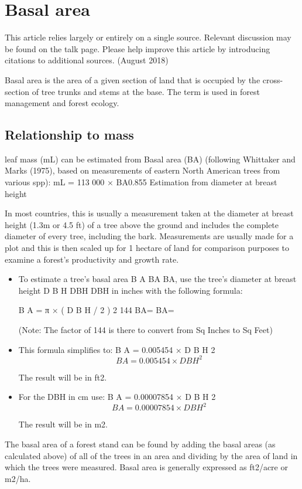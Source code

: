 
\section{Basal area}
This article relies largely or entirely on a single source. Relevant discussion may be found on the talk page. Please help improve this article by introducing citations to additional sources. (August 2018)

Basal area is the area of a given section of land that is occupied by the cross-section of tree trunks and stems at the base. The term is used in forest management and forest ecology.
\subsection{Relationship to mass}

leaf mass (mL) can be estimated from Basal area (BA) (following Whittaker and Marks (1975), based on measurements of eastern North American trees from various spp): mL = 113 000 × BA0.855
Estimation from diameter at breast height

In most countries, this is usually a measurement taken at the diameter at breast height (1.3m or 4.5 ft) of a tree above the ground and includes the complete diameter of every tree, including the bark. Measurements are usually made for a plot and this is then scaled up for 1 hectare of land for comparison purposes to examine a forest's productivity and growth rate.

\begin{itemize}
\item To estimate a tree's basal area B A {\displaystyle BA} BA, use the tree's diameter at breast height D B H {\displaystyle DBH} DBH in inches with the following formula:

B A = π × ( D B H / 2 ) 2 144 {\displaystyle BA={}} BA={}

(Note: The factor of 144 is there to convert from Sq Inches to Sq Feet)

\item This formula simplifies to: B A = 0.005454 × D B H 2 \[{\displaystyle BA=0.005454\times DBH^{2}} \]

The result will be in ft2.

\item For the DBH in cm use: B A = 0.00007854 × D B H 2 \[{\displaystyle BA=0.00007854\times DBH^{2}} \]

The result will be in m2.
\end{itemize}
The basal area of a forest stand can be found by adding the basal areas (as calculated above) of all of the trees in an area and dividing by the area of land in which the trees were measured. Basal area is generally expressed as ft2/acre or m2/ha.

